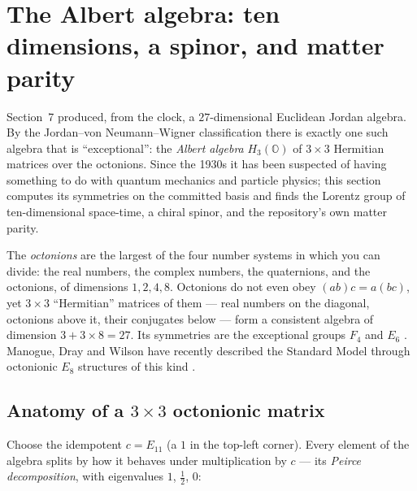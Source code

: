 \section{The Albert algebra: ten dimensions, a spinor, and matter parity}
\label{sec:lorentz}

Section~7 produced, from the clock, a $27$-dimensional Euclidean Jordan algebra. By the
Jordan--von Neumann--Wigner classification there is exactly one such algebra that is
``exceptional'': the \emph{Albert algebra} $H_3(\mathbb O)$ of $3\times3$ Hermitian matrices
over the octonions. Since the 1930s it has been suspected of having something to do with
quantum mechanics and particle physics; this section computes its symmetries on the
committed basis and finds the Lorentz group of ten-dimensional space-time, a chiral spinor,
and the repository's own matter parity.

\begin{plainwords}
The \emph{octonions} are the largest of the four number systems in which you can divide:
the real numbers, the complex numbers, the quaternions, and the octonions, of dimensions
$1,2,4,8$. Octonions do not even obey $(ab)c=a(bc)$, yet $3\times3$ ``Hermitian'' matrices of
them --- real numbers on the diagonal, octonions above it, their conjugates below --- form a
consistent algebra of dimension $3+3\times8=27$. Its symmetries are the exceptional groups
$F_4$ and $E_6$ \cite{Baez2002}. Manogue, Dray and Wilson have recently described the
Standard Model through octonionic $E_8$ structures of this kind \cite{MDW2022}.
\end{plainwords}

\subsection{Anatomy of a \texorpdfstring{$3\times3$}{3x3} octonionic matrix}

Choose the idempotent $c=E_{11}$ (a $1$ in the top-left corner). Every element of the
algebra splits by how it behaves under multiplication by $c$ --- its \emph{Peirce
decomposition}, with eigenvalues $1$, $\tfrac12$, $0$:

